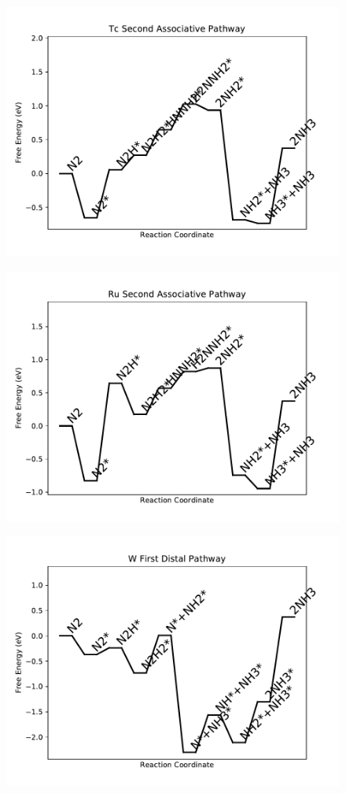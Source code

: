 \begin{figure}
\centering
\includegraphics[width=0.8\linewidth]{data/plots/Tc_associative_2.pdf}
\end{figure}

\begin{figure}
\centering
\includegraphics[width=0.8\linewidth]{data/plots/Ru_associative_2.pdf}
\end{figure}

\begin{figure}
\centering
\includegraphics[width=0.8\linewidth]{data/plots/W_distal_1.pdf}
\end{figure}

